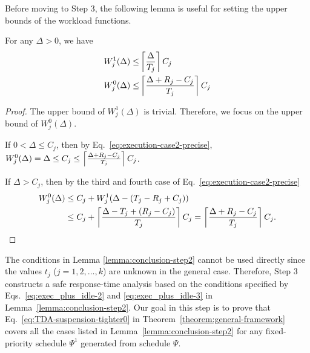 Before moving to Step 3, the following lemma is useful for setting the upper bounds of the workload functions.
\begin{Lemma}
  \label{lemma:W_0-and-W_1-upper}
For any $\Delta > 0$, we have
\begin{align}
  W_j^1(\Delta)  \leq &\ceiling{\frac{\Delta}{T_j}}C_j %
  \label{eq:W_1-upper}\\
  W_j^0(\Delta)  \leq &\ceiling{\frac{\Delta+R_j-C_j}{T_j}}C_j %
  \label{eq:W_0-upper}
\end{align}
\end{Lemma}
\begin{proof}
  The upper bound of $W_j^1(\Delta)$ is trivial. Therefore, we focus on the upper bound of $W_j^0(\Delta)$. 
  
  If $0 < \Delta \leq C_j$, then by Eq.~\eqref{eq:execution-case2-precise}, $W_j^0(\Delta) = \Delta \leq C_j \leq \left\lceil{\frac{\Delta+R_j-C_j}{T_j}}\right\rceil C_j$. 
  
  If $\Delta > C_j$, then by the third and fourth case of Eq.~\eqref{eq:execution-case2-precise}
{\footnotesize \begin{align*}
W_j^0(\Delta) &\leq C_j + W_j^1(\Delta - (T_j-R_j+C_j))\nonumber\\
& \leq C_j+\left\lceil{\frac{\Delta-T_j +(R_j-C_j)}{T_j}}\right\rceil C_j  = \left\lceil{\frac{\Delta+R_j-C_j}{T_j}}\right\rceil C_j. 
\end{align*}} %
\end{proof}







The conditions in Lemma \ref{lemma:conclusion-step2}  cannot be used directly since the values $t_j$ ($j=1,2,\ldots,k$)
are unknown in the general case. %
Therefore, Step 3 constructs a safe response-time analysis based on the
conditions specified by Eqs.~\eqref{eq:exec_plus_idle-2} and
\eqref{eq:exec_plus_idle-3} in Lemma~\ref{lemma:conclusion-step2}. Our
goal in this step is to prove that Eq.~\eqref{eq:TDA-suspension-tighter0} in Theorem~\ref{theorem:general-framework} covers all the cases listed
in Lemma~\ref{lemma:conclusion-step2} for any fixed-priority schedule $\Psi^1$ generated from schedule $\Psi$.

